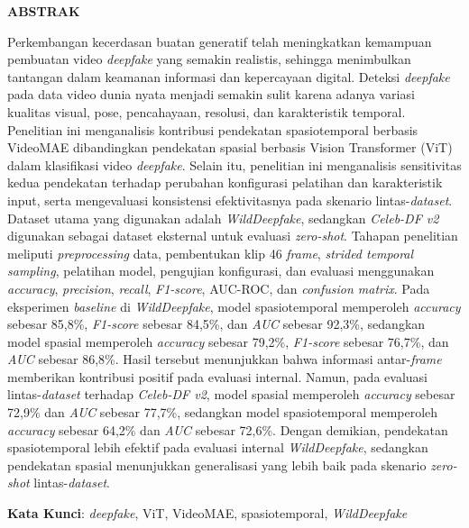 \clearpage
{}%
\thispagestyle{fancy}

\begin{center}
	\large \bfseries \MakeUppercase{Abstrak}\\
	\bigskip
	
	\normalsize \normalfont \justifying \singlespacing
	Perkembangan kecerdasan buatan generatif telah meningkatkan kemampuan pembuatan video \textit{deepfake} yang semakin realistis, sehingga menimbulkan tantangan dalam keamanan informasi dan kepercayaan digital. Deteksi \textit{deepfake} pada data video dunia nyata menjadi semakin sulit karena adanya variasi kualitas visual, pose, pencahayaan, resolusi, dan karakteristik temporal. Penelitian ini menganalisis kontribusi pendekatan spasiotemporal berbasis VideoMAE dibandingkan pendekatan spasial berbasis Vision Transformer (ViT) dalam klasifikasi video \textit{deepfake}. Selain itu, penelitian ini menganalisis sensitivitas kedua pendekatan terhadap perubahan konfigurasi pelatihan dan karakteristik input, serta mengevaluasi konsistensi efektivitasnya pada skenario lintas-\textit{dataset}. Dataset utama yang digunakan adalah \textit{WildDeepfake}, sedangkan \textit{Celeb-DF v2} digunakan sebagai dataset eksternal untuk evaluasi \textit{zero-shot}. Tahapan penelitian meliputi \textit{preprocessing} data, pembentukan klip 46 \textit{frame}, \textit{strided temporal sampling}, pelatihan model, pengujian konfigurasi, dan evaluasi menggunakan \textit{accuracy}, \textit{precision}, \textit{recall}, \textit{F1-score}, AUC-ROC, dan \textit{confusion matrix}. Pada eksperimen \textit{baseline} di \textit{WildDeepfake}, model spasiotemporal memperoleh \textit{accuracy} sebesar 85,8\%, \textit{F1-score} sebesar 84,5\%, dan \textit{AUC} sebesar 92,3\%, sedangkan model spasial memperoleh \textit{accuracy} sebesar 79,2\%, \textit{F1-score} sebesar 76,7\%, dan \textit{AUC} sebesar 86,8\%. Hasil tersebut menunjukkan bahwa informasi antar-\textit{frame} memberikan kontribusi positif pada evaluasi internal. Namun, pada evaluasi lintas-\textit{dataset} terhadap \textit{Celeb-DF v2}, model spasial memperoleh \textit{accuracy} sebesar 72,9\% dan \textit{AUC} sebesar 77,7\%, sedangkan model spasiotemporal memperoleh \textit{accuracy} sebesar 64,2\% dan \textit{AUC} sebesar 72,6\%. Dengan demikian, pendekatan spasiotemporal lebih efektif pada evaluasi internal \textit{WildDeepfake}, sedangkan pendekatan spasial menunjukkan generalisasi yang lebih baik pada skenario \textit{zero-shot} lintas-\textit{dataset}. \par

    \vspace{20pt}
	\raggedright \textbf{Kata Kunci}: \textit{deepfake}, ViT, VideoMAE, spasiotemporal, \textit{WildDeepfake}
	
	\vfill
	
\end{center}
\clearpage
